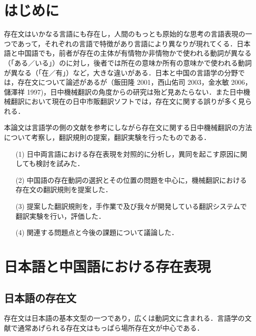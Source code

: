 \documentclass[japanese]{jnlp_1.4}
\begin{document}
\maketitle



\section{はじめに}

存在文はいかなる言語にも存在し，人間のもっとも原始的な思考の言語表現の一つであって，それぞれの言語で特徴があり言語により異なりが現れてくる．日本語と中国語でも，前者が存在の主体が有情物か非情物かで使われる動詞が異なる（「ある／いる」）のに対し，後者では所在の意味か所有の意味かで使われる動詞が異なる（「在／有」）など，大きな違いがある．日本と中国の言語学の分野では，存在文について論述があるが（飯田隆 2001，西山佑司 2003，金水敏 2006，儲澤祥 1997)，日中機械翻訳の角度からの研究は殆ど見あたらない．また日中機械翻訳において現在の日中市販翻訳ソフトでは，存在文に関する誤りが多く見られる．

本論文は言語学の側の文献を参考にしながら存在文に関する日中機械翻訳の方法について考察し，翻訳規則の提案，翻訳実験を行ったものである．

\begin{itemize}
\item[(1)]
日中両言語における存在表現を対照的に分析し，異同を起こす原因に関しても検討を試みた．

\item[(2)]
中国語の存在動詞の選択とその位置の問題を中心に，機械翻訳における存在文の翻訳規則を提案した．

\item[(3)]
提案した翻訳規則を，手作業で及び我々が開発している翻訳システムで翻訳実験を行い，評価した．

\item[(4)]
関連する問題点と今後の課題について議論した．
\end{itemize}



\section{日本語と中国語における存在表現}


\subsection{日本語の存在文}

存在文は日本語の基本文型の一つであり，広くは動詞文に含まれる．言語学の文献で通常あげられる存在文はもっぱら場所存在文が中心である．
\end{document}
